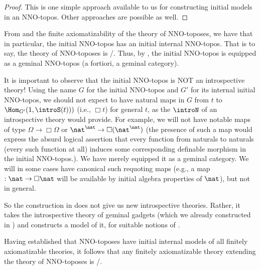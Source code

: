 \begin{proof}
This is one simple approach available to us for constructing initial models in an NNO-topos. Other approaches are possible as well.

\end{proof}

From  and the finite axiomatizability of the theory of NNO-toposes, we have that in particular, the initial NNO-topos has an initial internal NNO-topos. That is to say, the theory of NNO-toposes is \initogeminal/. Thus, by , the initial NNO-topos is equipped as a geminal NNO-topos (a fortiori, a geminal category).

\begin{warningenv}\label{InitoGeminalWarning}
It is important to observe that the initial NNO-topos is NOT an introspective theory! Using the name $G$ for the initial NNO-topos and $G'$ for its internal initial NNO-topos, we should not expect to have natural maps in $G$ from $t$ to $\Hom_{G'}(1, \introS(t)))$ (i.e., $\Box t$) for general $t$, as the $\introN$ of an introspective theory would provide. For example, we will not have notable maps of type $\Omega \to \Box \Omega$ or $\nat^{\nat} \to \Box(\nat^{\nat})$ (the presence of such a map would express the absurd logical assertion that every function from naturals to naturals (every such function at all) induces some corresponding definable morphism in the initial NNO-topos.). We have merely equipped it as a geminal category. We will in some cases have canonical such requoting maps (e.g., a map $: \nat \to \Box \nat$ will be available by initial algebra properties of $\nat$), but not in general.

So the construction in  does not give us new introspective theories. Rather, it takes the introspective theory of geminal gadgets (which we already constructed in \TODO) and constructs a model of it, for suitable notions of .
\end{warningenv}

Having established that NNO-toposes have initial internal models of all finitely axiomatizable theories, it follows that any finitely axiomatizable theory extending the theory of NNO-toposes is \initogeminal/.

